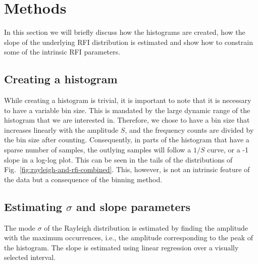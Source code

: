 \documentclass[useAMS,usenatbib]{mn2e}
\begin{document}
\section{Methods} \label{sec:distribution-methods}
In this section we will briefly discuss how the histograms are created, how the slope of the underlying RFI distribution is estimated and show how to constrain some of the intrinsic RFI parameters.

\subsection{Creating a histogram} \label{sec:histogram}
While creating a histogram is trivial, it is important to note that it is necessary to have a variable bin size. This is mandated by the large dynamic range of the histogram that we are interested in. Therefore, we chose to have a bin size that increases linearly with the amplitude $S$, and the frequency counts are divided by the bin size after counting. Consequently, in parts of the histogram that have a sparse number of samples, the outlying samples will follow a $1/S$ curve, or a -1 slope in a log-log plot. This can be seen in the tails of the distributions of Fig.~\ref{fig:rayleigh-and-rfi-combined}. This, however, is not an intrinsic feature of the data but a consequence of the binning method.

\subsection{Estimating $\sigma$ and slope parameters}
The mode $\sigma$ of the Rayleigh distribution is estimated by finding the amplitude with the maximum occurrences, i.e., the amplitude corresponding to the peak of the histogram. The slope is estimated using linear regression over a visually selected interval.
\end{document}

